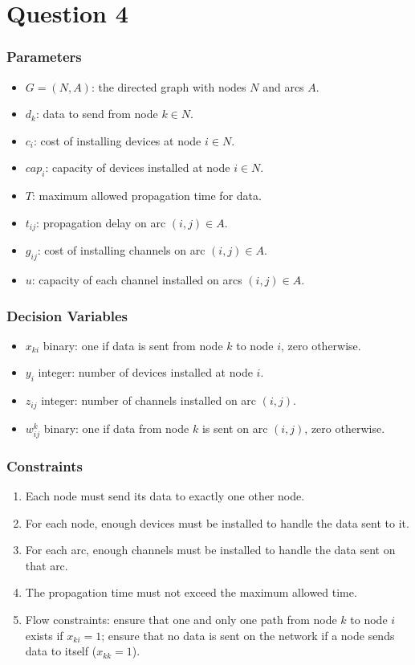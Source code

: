 \section{Question 4}

\subsubsection*{Parameters}

\begin{itemize}
	\item $G = (N, A)$: the directed graph with nodes $N$ and arcs $A$.
	\item $d_k$: data to send from node $k \in N$.
	\item $c_i$: cost of installing devices at node $i \in N$.
	\item $cap_i$: capacity of devices installed at node $i \in N$.
	\item $T$: maximum allowed propagation time for data.
	\item $t_{ij}$: propagation delay on arc $(i, j) \in A$.
	\item $g_{ij}$: cost of installing channels on arc $(i, j) \in A$.
	\item $u$: capacity of each channel installed on arcs $(i, j) \in A$.
\end{itemize}

\subsubsection*{Decision Variables}

\begin{itemize}
	\item $x_{ki}$ binary: one if data is sent from node $k$ to node $i$, zero otherwise.
	\item $y_i$ integer: number of devices installed at node $i$.
	\item $z_{ij}$ integer: number of channels installed on arc $(i, j)$.
	\item $w_{ij}^k$ binary: one if data from node $k$ is sent on arc $(i, j)$, zero otherwise.
\end{itemize}

\subsubsection*{Constraints}

\begin{enumerate}
	\item Each node must send its data to exactly one other node.
	\item For each node, enough devices must be installed to handle the data sent to it.
	\item For each arc, enough channels must be installed to handle the data sent on that arc.
	\item The propagation time must not exceed the maximum allowed time.
	\item Flow constraints: ensure that one and only one path from node $k$ to node $i$ exists if $x_{ki} = 1$; ensure that no data is sent on the network if a node sends data to itself ($x_{kk} = 1$).
\end{enumerate}

